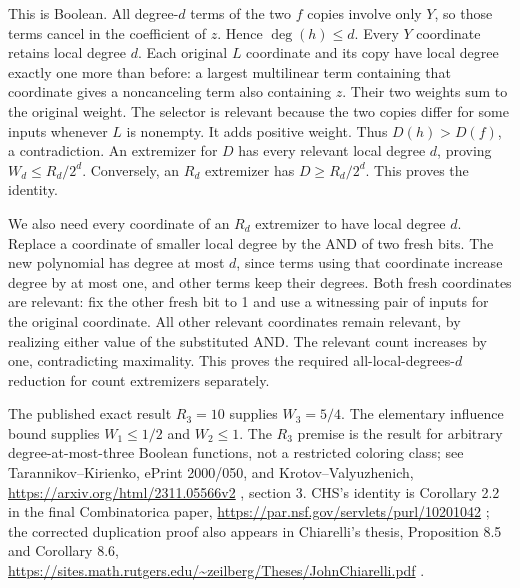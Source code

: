 \documentclass[11pt]{article}
\theoremstyle{remark}
\theoremstyle{correctionstyle}
\begin{document}
\leavevmode\label{src-p014}This is Boolean. All degree-$d$ terms of the two $f$ copies involve only $Y$,
so those terms cancel in the coefficient of $z$. Hence $\deg(h)\le d$. Every $Y$
coordinate retains local degree $d$. Each original $L$ coordinate and its
copy have local degree exactly one more than before: a largest multilinear
term containing that coordinate gives a noncanceling term also containing $z$.
Their two weights sum to the original weight. The selector is relevant
because the two copies differ for some inputs whenever $L$ is nonempty.
It adds positive weight. Thus $D(h)>D(f)$, a contradiction. An extremizer
for $D$ has every relevant local degree $d$, proving $W_d\le R_d/2^d$. Conversely,
an $R_d$ extremizer has $D\ge R_d/2^d$. This proves the identity.\label{src-end-p014}\par

\leavevmode\label{src-p015}We also need every coordinate of an $R_d$ extremizer to have local degree $d$.
Replace a coordinate of smaller local degree by the
AND of two fresh bits. The new polynomial has degree at most $d$, since
terms using that coordinate increase degree by at most one, and other
terms keep their degrees. Both fresh coordinates are relevant: fix the
other fresh bit to 1 and use a witnessing pair of inputs for the original
coordinate. All other relevant coordinates remain relevant, by realizing
either value of the substituted AND. The relevant count increases by one,
contradicting maximality. This proves the required all-local-degrees-$d$
reduction for count extremizers separately.\label{src-end-p015}\par

\leavevmode\label{src-p016}The published exact result $R_3=10$ supplies $W_3=5/4$. The elementary influence
bound supplies $W_1\le 1/2$ and $W_2\le 1$. The $R_3$ premise is the result for
arbitrary degree-at-most-three Boolean functions, not a restricted coloring
class; see Tarannikov–Kirienko, ePrint 2000/050, and Krotov–Valyuzhenich,
\url{https://arxiv.org/html/2311.05566v2} , section 3. CHS's identity is Corollary
2.2 in the final Combinatorica paper, \url{https://par.nsf.gov/servlets/purl/10201042} ;
the corrected duplication proof also appears in Chiarelli's thesis,
Proposition 8.5 and Corollary 8.6,
\url{https://sites.math.rutgers.edu/~zeilberg/Theses/JohnChiarelli.pdf} .\label{src-end-p016}\par
\end{document}

